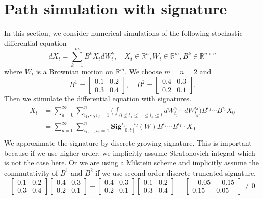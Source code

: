 \documentclass[12pt]{report}
\theoremstyle{definition}
\theoremstyle{remark}
\newcommand{\R}{\mathbb{R}}
\begin{document}
\section{Path simulation with signature}
In this section, we consider numerical simulations of the following stochastic differential equation
\begin{equation*}
  dX_t = \sum_{k=1}^{m} B^{k}X_{t}dW^{k}_{t},\quad X_{t}\in \mathbb{R}^{n}, W_{t}\in\mathbb{R}^{m}, B^{k} \in \mathbb{R}^{n\times n}
\end{equation*}
where $W_{t}$ is a Brownian motion on $\R^{m}$. We choose $m=n=2$ and 
\begin{equation*}
  B^{1} = \begin{bmatrix}
    0.1& 0.2\\
    0.3& 0.4
  \end{bmatrix},\quad 
  B^{2} = \begin{bmatrix}
    0.4& 0.3\\
    0.2& 0.1
  \end{bmatrix}.
\end{equation*}
Then we stimulate the differential equation with signatures.
\begin{equation*}
  \begin{split}
    X_t &= \sum_{d = 0}^{\infty}\sum_{i_{1},\cdots,i_{d} = 1}^{n} \bigg(\int_{0\leq t_{1}\leq\cdots\leq t_{d}\leq t}dW^{i_{1}}_{t_{1}}\cdots dW^{i_{d}}_{t_{d}}\bigg)B^{i_{d}}\cdots B^{i_{1}} X_{0}\\
    &= \sum_{d = 0}^{\infty}\sum_{i_{1},\cdots,i_{d} = 1}^{n} \mathbf{Sig}^{i_{1},\cdots,i_{d}}_{[0,t]}(W) B^{i_{d}}\cdots B^{i_{1}} \cdot X_{0}\\
  \end{split}
\end{equation*}
We approximate the signature by discrete growing signature. This is important because if we use higher order, we implicitly assume Stratonovich integral which is not the case here. Or we are using a Milstein scheme and implicitly assume the commutativity of $B^{1}$ and $B^{2}$ if we use second order discrete truncated signature.
\begin{equation*}
  \begin{bmatrix}
    0.1& 0.2\\
    0.3& 0.4
  \end{bmatrix}
  \begin{bmatrix}
    0.4& 0.3\\
    0.2& 0.1
  \end{bmatrix} 
  - 
  \begin{bmatrix}
    0.4& 0.3\\
    0.2& 0.1
  \end{bmatrix}
  \begin{bmatrix}
    0.1& 0.2\\
    0.3& 0.4
  \end{bmatrix}
  = 
  \begin{bmatrix}
    -0.05& -0.15\\
    0.15& 0.05
  \end{bmatrix} \neq 0
\end{equation*} 
\end{document}
